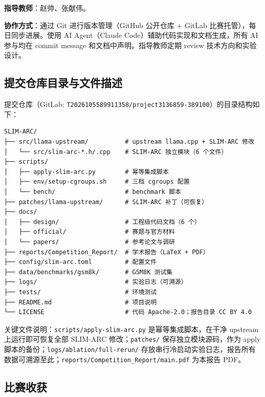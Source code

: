 \textbf{指导教师}：赵帅、张献伟。

\textbf{协作方式}：通过 Git 进行版本管理（GitHub 公开仓库 + GitLab 比赛托管），每日同步进展。使用 AI Agent（Claude Code）辅助代码实现和文档生成，所有 AI 参与均在 commit message 和文档中声明。指导教师定期 review 技术方向和实验设计。

\subsection{提交仓库目录与文件描述}

提交仓库（GitLab: \texttt{T2026105589911358/project3136859-389100}）的目录结构如下：

\begin{verbatim}
SLIM-ARC/
├── src/llama-upstream/          # upstream llama.cpp + SLIM-ARC 修改
│   └── src/slim-arc-*.h/.cpp    # SLIM-ARC 独立模块（6 个文件）
├── scripts/
│   ├── apply-slim-arc.py        # 幂等集成脚本
│   ├── env/setup-cgroups.sh     # 三档 cgroups 配置
│   └── bench/                   # benchmark 脚本
├── patches/llama-upstream/      # SLIM-ARC 补丁（可恢复）
├── docs/
│   ├── design/                  # 工程级代码文档（6 个）
│   ├── official/                # 赛题与官方材料
│   └── papers/                  # 参考论文与调研
├── reports/Competition_Report/  # 学术报告（LaTeX + PDF）
├── config/slim-arc.toml         # 配置文件
├── data/benchmarks/gsm8k/       # GSM8K 测试集
├── logs/                        # 实验日志（可溯源）
├── tests/                       # 环境测试
├── README.md                    # 项目说明
└── LICENSE                      # 代码 Apache-2.0；报告目录 CC BY 4.0
\end{verbatim}

关键文件说明：\texttt{scripts/apply-slim-arc.py} 是幂等集成脚本，在干净 upstream 上运行即可恢复全部 SLIM-ARC 修改；\texttt{patches/} 保存独立模块源码，作为 apply 脚本的备份；\texttt{logs/ablation/full-rerun/} 存放串行冷启动实验日志，报告所有数据可溯源至此；\texttt{reports/Competition\_Report/main.pdf} 为本报告 PDF。

\subsection{比赛收获}

